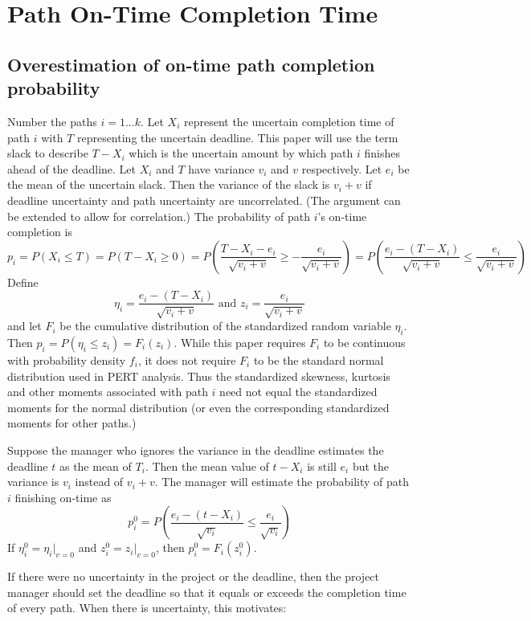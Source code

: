 \documentclass[11pt]{article}
\begin{document}
          \section{Path On-Time Completion Time}
          \subsection{Overestimation of on-time path completion probability}
Number the paths $i=1...k$. Let $X_i$ represent the uncertain completion time of path $i$ with $T$ representing the uncertain deadline.  This paper will use the term slack to describe $T-X_i$ which is the uncertain amount by which path $i$ finishes ahead of the deadline.  Let $X_i$ and $T$ have variance $v_i$ and $v$ respectively.  Let $e_i$ be the mean of the uncertain slack.  Then the variance of the slack is $v_i+v$ if deadline uncertainty and path uncertainty are uncorrelated. (The argument can be extended to allow for correlation.)
The probability of path $i$'s on-time completion is
$$ p_i = P(X_i \leq T) = P(T-X_i \geq 0) = P(\frac{T-X_i-e_i}{\sqrt{v_i+v}} \geq - \frac{e_i}{\sqrt{v_i+v}})  =
P(\frac{e_i-(T-X_i)}{\sqrt{v_i+v}} \leq \frac{e_i}{\sqrt{v_i+v}})  $$
Define
$$
\eta_i = \frac{e_i-(T-X_i)}{\sqrt{v_i+v}} \mbox{ and }
z_i = \frac{e_i}{\sqrt{v_i+v}}  $$
and let
$F_i$ be the cumulative distribution of the standardized random variable $\eta_i$.  Then $p_i=P(\eta_i \leq z_i)=F_i(z_i)$.  
While this paper requires $F_i$ to be continuous with probability density $f_i$, it does not require $F_i$ to be the standard normal distribution used in PERT analysis.   Thus the standardized skewness, kurtosis and other moments associated with path $i$ need not equal the standardized moments for the normal distribution (or even the corresponding standardized moments for other paths.) 
\par   
Suppose the manager who ignores the variance in the deadline estimates the deadline $t$ as the mean of $T_i$.  Then the mean value of $t-X_i$ is still $e_i$ but the variance is $v_i$ instead of $v_i+v$. The manager will estimate the probability of path $i$ finishing on-time as 
$$ p^0_i= P(\frac{e_i-(t-X_i)}{\sqrt{v_i}} \leq \frac{e_i}{\sqrt{v_i}})  $$
If $\eta^0_i=\eta_i|_{v=0}$ and $z^0_i=z_i|_{v=0}$, then $p^0_i=F_i(z^0_i)$.\par 
If there were no uncertainty in the project or the deadline, then the project manager should set the deadline so that it equals or exceeds the completion time of every path.  When there is uncertainty, this motivates:
\\
\end{document}
